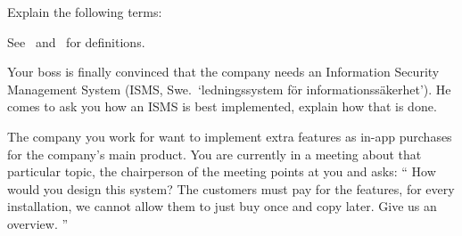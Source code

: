 \documentclass[svv,addpoints]{miunexam}
\begin{document}
\begin{questions}


  
\question\label{q:crypto:foundations:E}
  Explain the following terms:

  \begin{solution}
    See~\cite{Gollmann2011cs} and~\cite{Anderson2008sea} for definitions.
  \end{solution}


  
\question[5]\label{q:msb:E:C}
  Your boss is finally convinced that the company needs an Information Security 
  Management System (ISMS, Swe.~`ledningssystem för informationssäkerhet').
  He comes to ask you how an ISMS is best implemented, explain how that is 
  done.


  
\question\label{q:trustcomp:C:A}
  The company you work for want to implement extra features as in-app purchases 
  for the company's main product.
  You are currently in a meeting about that particular topic, the chairperson 
  of the meeting points at you and asks:
  \enquote{%
    How would you design this system?
    The customers must pay for the features, for every installation, we cannot 
    allow them to just buy once and copy later.
    Give us an overview.
  }
  \begin{parts}

\end{parts}
\end{questions}
\end{document}
